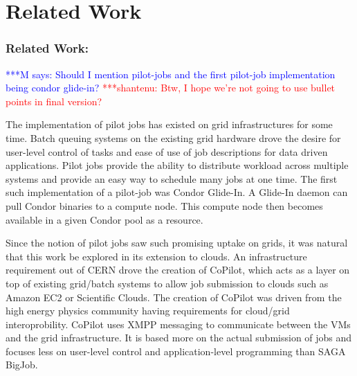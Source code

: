 \documentclass[times]{cpeauth}
\newcommand{\jhanote}[1]{ {\textcolor{red} { ***shantenu: #1 }}}
\newcommand{\mrnote}[1]{ {\textcolor{blue} { ***M says: #1 }}}
\newcommand{\pmnote}[1]{ {\textcolor{blue} { ***Pradeep: #1 }}}
\newcommand{\note}[1]{ {\textcolor{magenta} { ***Note: #1 }}}
\newcommand{\mrnote}[1]{}
\newcommand{\pmnote}[1]{}
\newcommand{\jhanote}[1]{}
\newcommand{\note}[1]{}
\begin{document}






\section{Related Work}


\subsubsection*{Related Work:} 


\mrnote{Should I mention pilot-jobs and the first pilot-job implementation being condor glide-in?}
\jhanote{Btw, I hope we're not going to use bullet points in final version?}

The implementation of pilot jobs has existed on grid infrastructures for some time. Batch queuing systems on the existing grid hardware drove the desire for user-level control of tasks and ease of use of job descriptions for data driven applications. Pilot jobs provide the ability to distribute workload across multiple systems and provide an easy way to schedule many jobs at one time. The first such implementation of a pilot-job was Condor Glide-In. A Glide-In daemon can pull Condor binaries to a compute node. This compute node then becomes available in a given Condor pool as a resource.

Since the notion of pilot jobs saw such promising uptake on grids, it was natural that this work be explored in its extension to clouds. An infrastructure requirement out of CERN drove the creation of CoPilot, which acts as a layer on top of existing grid/batch systems to allow job submission to clouds such as Amazon EC2 or Scientific Clouds. The creation of CoPilot was driven from the high energy physics community having requirements for cloud/grid interoprobility. CoPilot uses XMPP messaging to communicate between the VMs and the grid infrastructure. It is based more on the actual submission of jobs and focuses less on user-level control and application-level programming than SAGA BigJob.
\end{document}

